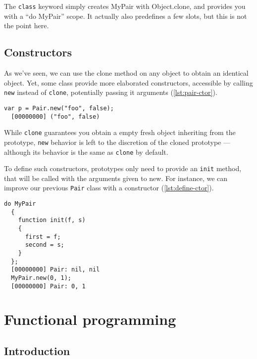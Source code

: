 \documentclass[openright,twoside,12pt]{report}
\begin{document}
The \texttt{class} keyword simply creates MyPair with Object.clone,
and provides you with a ``do MyPair'' scope. It actually also
predefines a few slots, but this is not the point here.

\section{Constructors}

As we've seen, we can use the clone method on any object to obtain an
identical object. Yet, some class provide more elaborated
constructors, accessible by calling \texttt{new} instead of
\texttt{clone}, potentially passing it arguments (\autoref{lst:pair-ctor}).

\begin{lstlisting}[caption=Calling constructors with \texttt{new},
  label=lst:pair-ctor]
  var p = Pair.new("foo", false);
  [00000000] ("foo", false)
\end{lstlisting}

While \texttt{clone} guarantees you obtain a empty fresh object
inheriting from the prototype, \texttt{new} behavior is left to the
discretion of the cloned prototype --- although its behavior is the
same as \texttt{clone} by default.

To define such constructors, prototypes only need to provide an
\texttt{init} method, that will be called with the arguments given to
new. For instance, we can improve our previous \texttt{Pair} class
with a constructor (\autoref{lst:define-ctor}).

\begin{lstlisting}[caption=Defining constructors, label=lst:define-ctor]
  do MyPair
  {
    function init(f, s)
    {
      first = f;
      second = s;
    }
  };
  [00000000] Pair: nil, nil
  MyPair.new(0, 1);
  [00000000] Pair: 0, 1
\end{lstlisting}


\chapter{Functional programming}
\label{section:functional}

\section{Introduction}
\end{document}
